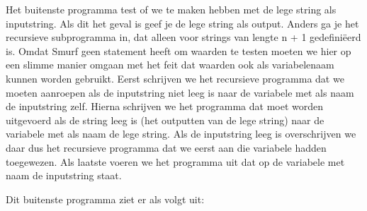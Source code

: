 Het buitenste programma test of we te maken hebben met de lege string als inputstring. Als dit het geval is geef je de lege string als output. Anders ga je het recursieve subprogramma in, dat alleen voor strings van lengte n + 1 gedefini\"{e}erd is.
Omdat Smurf geen statement heeft om waarden te testen moeten we hier op een slimme manier omgaan met het feit dat waarden ook als variabelenaam kunnen worden gebruikt. Eerst schrijven we het recursieve programma dat we moeten aanroepen als de inputstring niet leeg is naar de variabele met als naam de inputstring zelf. Hierna schrijven we het programma dat moet worden uitgevoerd als de string leeg is (het outputten van de lege string) naar de variabele met als naam de lege string. Als de inputstring leeg is overschrijven we daar dus het recursieve programma dat we eerst aan die variabele hadden toegewezen. Als laatste voeren we het programma uit dat op de variabele met naam de inputstring staat.

Dit buitenste programma ziet er als volgt uit:
\begin{center}
\end{center}


